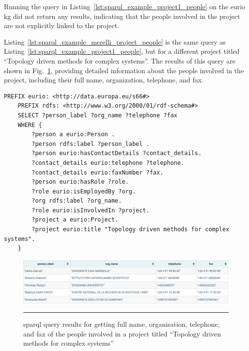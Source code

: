 Running the query in Listing~\ref{lst:sparql_example_project1_people} on the \gls{eurio} \gls{kg} did not return any results, indicating that the people involved in the project are not explicitly linked to the project.

Listing~\ref{lst:sparql_example_merelli_project_people} is the same query as Listing~\ref{lst:sparql_example_project1_people}, but for a different project titled ``Topology driven methods for complex systems''.
The results of this query are shown in Fig.~\ref{fig:sparql_example_merelli_project_people}, providing detailed information about the people involved in the project, including their full name, organization, telephone, and fax.

\begin{lstlisting}[language=SPARQL, caption={\gls{sparql} query for getting full name, organisation, telephone, and fax of the people involved in a project titled ``Topology driven methods for complex systems''}, label=lst:sparql_example_merelli_project_people]
    PREFIX eurio: <http://data.europa.eu/s66#>
    PREFIX rdfs: <http://www.w3.org/2000/01/rdf-schema#>
    SELECT ?person_label ?org_name ?telephone ?fax
    WHERE {
        ?person a eurio:Person .
        ?person rdfs:label ?person_label .
        ?person eurio:hasContactDetails ?contact_details.
        ?contact_details eurio:telephone ?telephone.
        ?contact_details eurio:faxNumber ?fax.
        ?person eurio:hasRole ?role.
        ?role eurio:isEmployedBy ?org.
        ?org rdfs:label ?org_name.
        ?role eurio:isInvolvedIn ?project.
        ?project a eurio:Project.
        ?project eurio:title "Topology driven methods for complex systems".
    }
\end{lstlisting}

\begin{figure}[htbp]
    \centering
 \includegraphics[width=.9\textwidth]{figures/architecture/sparql_example_merelli_project_people.png}
     \rule{35em}{0.5pt}
    \caption{\gls{sparql} query results for getting full name, organisation, telephone, and fax of the people involved in a project titled ``Topology driven methods for complex systems''}
 \label{fig:sparql_example_merelli_project_people}
\end{figure}

